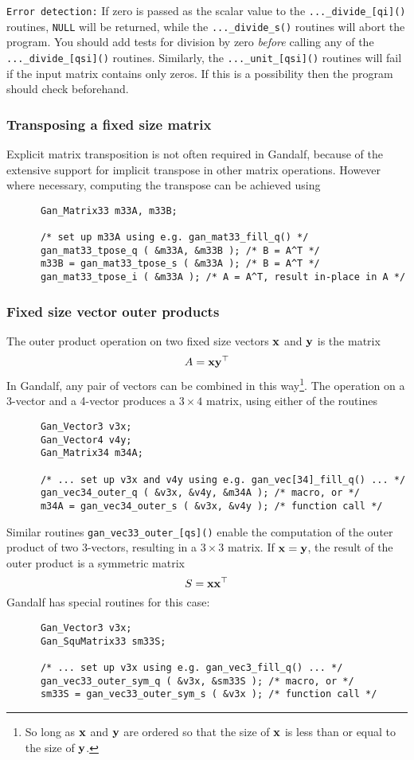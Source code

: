 {\tt Error detection:} If zero is passed as the scalar value to the
{\tt ...\_divide\_[qi]()} routines, {\tt NULL} will be returned, while the
{\tt ...\_divide\_s()} routines will abort the program. You should add tests
for division by zero {\em before} calling any of the {\tt ...\_divide\_[qsi]()}
routines. Similarly, the {\tt ...\_unit\_[qsi]()} routines will fail if
the input matrix contains only zeros. If this is a possibility then the
program should check beforehand.

\subsubsection{Transposing a fixed size matrix}
Explicit matrix transposition is not often required in Gandalf, because of
the extensive support for implicit transpose in other matrix operations.
However where necessary, computing the transpose can be achieved using
\begin{verbatim}
      Gan_Matrix33 m33A, m33B;

      /* set up m33A using e.g. gan_mat33_fill_q() */
      gan_mat33_tpose_q ( &m33A, &m33B ); /* B = A^T */
      m33B = gan_mat33_tpose_s ( &m33A ); /* B = A^T */
      gan_mat33_tpose_i ( &m33A ); /* A = A^T, result in-place in A */
\end{verbatim}

\subsubsection{Fixed size vector outer products} \label{fixed-vector-outer-sec}
The outer product operation on two fixed size vectors ${\bf x}$ and ${\bf y}$
is the matrix
\[ A = {\bf x} {\bf y}^{\top}
\]
In Gandalf, any pair of vectors can be combined in this way\footnote{So long as
${\bf x}$ and ${\bf y}$ are ordered so that the size of ${\bf x}$ is less than or
equal to the size of ${\bf y}$.}. The operation
on a 3-vector and a 4-vector produces a $3\times 4$ matrix, using either of
the routines
\begin{verbatim}
      Gan_Vector3 v3x;
      Gan_Vector4 v4y;
      Gan_Matrix34 m34A;

      /* ... set up v3x and v4y using e.g. gan_vec[34]_fill_q() ... */
      gan_vec34_outer_q ( &v3x, &v4y, &m34A ); /* macro, or */
      m34A = gan_vec34_outer_s ( &v3x, &v4y ); /* function call */
\end{verbatim}
Similar routines {\tt gan\_vec33\_outer\_[qs]()} enable the computation
of the outer product of two 3-vectors, resulting in a $3\times 3$ matrix.
If ${\bf x}={\bf y}$, the result of the outer product is a symmetric matrix
\[ S = {\bf x} {\bf x}^{\top}
\]
Gandalf has special routines for this case:
\begin{verbatim}
      Gan_Vector3 v3x;
      Gan_SquMatrix33 sm33S;

      /* ... set up v3x using e.g. gan_vec3_fill_q() ... */
      gan_vec33_outer_sym_q ( &v3x, &sm33S ); /* macro, or */
      sm33S = gan_vec33_outer_sym_s ( &v3x ); /* function call */
\end{verbatim}

